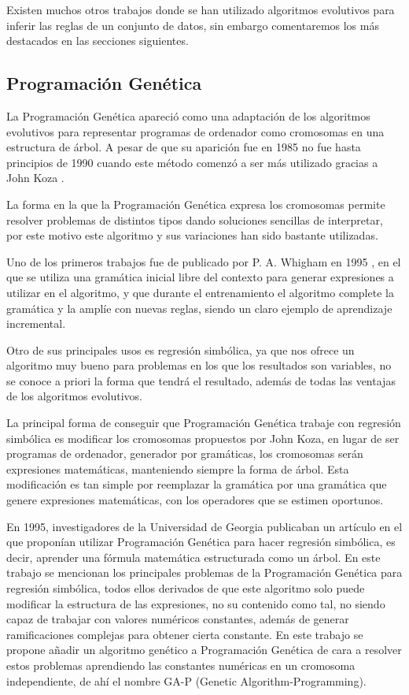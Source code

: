 Existen muchos otros trabajos donde se han utilizado algoritmos evolutivos para inferir las reglas de un conjunto de datos, sin embargo comentaremos los más destacados en las secciones siguientes.

\subsection{Programación Genética}

La Programación Genética apareció como una adaptación de los algoritmos evolutivos para representar programas de ordenador como cromosomas en una estructura de árbol. A pesar de que su aparición fue en 1985 no fue hasta principios de 1990 cuando este método comenzó a ser más utilizado gracias a John Koza \cite{kozaGP}.

La forma en la que la Programación Genética expresa los cromosomas permite resolver problemas de distintos tipos dando soluciones sencillas de interpretar, por este motivo este algoritmo y sus variaciones han sido bastante utilizadas.

Uno de los primeros trabajos fue de publicado por P. A. Whigham en 1995 \cite{PGgramaticas}, en el que se utiliza una gramática inicial libre del contexto para generar expresiones a utilizar en el algoritmo, y que durante el entrenamiento el algoritmo complete la gramática y la amplíe con nuevas reglas, siendo un claro ejemplo de aprendizaje incremental.


Otro de sus principales usos es regresión simbólica, ya que nos ofrece un algoritmo muy bueno para problemas en los que los resultados son variables, no se conoce a priori la forma que tendrá el resultado, además de todas las ventajas de los algoritmos evolutivos.

La principal forma de conseguir que Programación Genética trabaje con regresión simbólica es modificar los cromosomas propuestos por John Koza, en lugar de ser programas de ordenador, generador por gramáticas, los cromosomas serán expresiones matemáticas, manteniendo siempre la forma de árbol. Esta modificación es tan simple por reemplazar la gramática por una gramática que genere expresiones matemáticas, con los operadores que se estimen oportunos.

En 1995, investigadores de la Universidad de Georgia publicaban un artículo \cite{primerGAP} en el que proponían utilizar Programación Genética para hacer regresión simbólica, es decir, aprender una fórmula matemática estructurada como un árbol. En este trabajo se mencionan los principales problemas de la Programación Genética para regresión simbólica, todos ellos derivados de que este algoritmo solo puede modificar la estructura de las expresiones, no su contenido como tal, no siendo capaz de trabajar con valores numéricos constantes, además de generar ramificaciones complejas para obtener cierta constante. En este trabajo se propone añadir un algoritmo genético a Programación Genética de cara a resolver estos problemas aprendiendo las constantes numéricas en un cromosoma independiente, de ahí el nombre GA-P (Genetic Algorithm-Programming).

